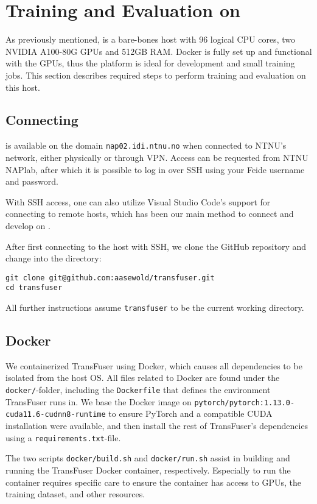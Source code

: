 \section{Training and Evaluation on \nap}
\label{app:instructions:nap02}

As previously mentioned,
\nap is a bare-bones host with
96 logical CPU cores,
two NVIDIA A100-80G GPUs
and 512GB RAM.
Docker is fully set up and functional with the GPUs,
thus the platform is ideal for development and small training jobs.
This section describes required steps to perform training and evaluation on this host.

\subsection{Connecting}

\nap is available on the domain \texttt{nap02.idi.ntnu.no}
when connected to NTNU's network, either physically or through VPN.
Access can be requested from NTNU NAPlab,
after which it is possible to log in over SSH using your Feide username and password.

With SSH access,
one can also utilize Visual Studio Code's support for connecting to remote hosts,
which has been our main method to connect and develop on \nap.

After first connecting to the host with SSH,
we clone the GitHub repository 
and change into the directory:
\begin{lstlisting}
git clone git@github.com:aasewold/transfuser.git
cd transfuser
\end{lstlisting}
All further instructions assume \texttt{transfuser} to be the current working directory.

\subsection{Docker}

We containerized TransFuser using Docker,
which causes all dependencies to be isolated from the host OS.
All files related to Docker are found under the \texttt{docker/}-folder,
including the \texttt{Dockerfile} that defines the environment TransFuser runs in.
We base the Docker image on \texttt{pytorch/pytorch:1.13.0-cuda11.6-cudnn8-runtime}
to ensure PyTorch and a compatible CUDA installation were available,
and then install the rest of TransFuser's dependencies using a \texttt{requirements.txt}-file.

The two scripts \texttt{docker/build.sh} and \texttt{docker/run.sh}
assist in building and running the TransFuser Docker container, respectively.
Especially to run the container requires specific care
to ensure the container has access to GPUs, the training dataset, and other resources.

